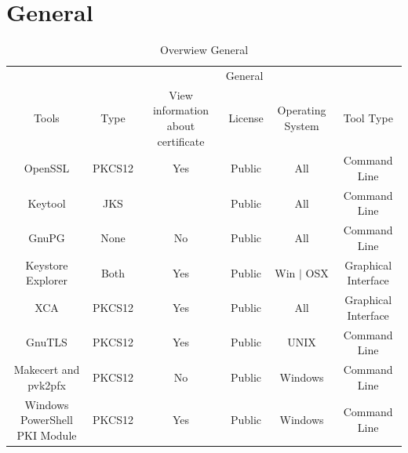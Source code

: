 \documentclass[10pt, a4paper]{report}
\begin{document}
\section{General}
\begin{table}[h!]
\centering
\caption{Overwiew General}
\label{my-label}
\begin{adjustbox}{max width=\textwidth}
\begin{tabular}{|c|c|c|c|c|c|}
\hline
                              & \multicolumn{5}{c|}{General}                                                                                   \\ \cline{2-6} 
\multirow{-2}{*}{Tools}       & Type   & View information about certificate                 & License & Operating System                        & Tool Type           \\ \hline
OpenSSL                       & PKCS12 & \cellcolor[HTML]{34FF34}Yes                        & Public  & \cellcolor[HTML]{34FF34}All             & Command Line        \\ \hline
Keytool                       & JKS    & \cellcolor[HTML]{34FF34}{\color[HTML]{000000} Yes} & Public  & \cellcolor[HTML]{34FF34}All             & Command Line        \\ \hline
GnuPG                         & None   & \cellcolor[HTML]{FE0000}No                         & Public  & \cellcolor[HTML]{34FF34}All             & Command Line        \\ \hline
Keystore Explorer             & Both   & \cellcolor[HTML]{34FF34}Yes                        & Public  & \cellcolor[HTML]{FFC702}Win $\vert$ OSX & Graphical Interface \\ \hline
XCA                           & PKCS12 & \cellcolor[HTML]{34FF34}Yes                        & Public  & \cellcolor[HTML]{34FF34}All             & Graphical Interface \\ \hline
GnuTLS                        & PKCS12 & \cellcolor[HTML]{34FF34}Yes                        & Public  & \cellcolor[HTML]{FFC702}UNIX            & Command Line        \\ \hline
Makecert and pvk2pfx          & PKCS12 & \cellcolor[HTML]{FE0000}No			    & Public  & \cellcolor[HTML]{FFC702}Windows         & Command Line        \\ \hline
Windows PowerShell PKI Module & PKCS12 & \cellcolor[HTML]{34FF34}Yes			    & Public  & \cellcolor[HTML]{FFC702}Windows         & Command Line        \\ \hline
\end{tabular}
\end{adjustbox}
\end{table}
\end{document}
